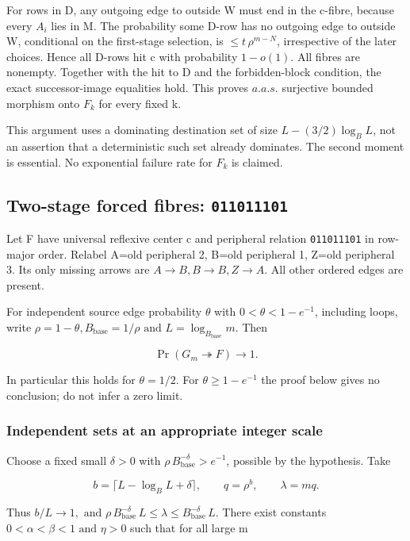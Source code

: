 \documentclass[11pt]{article}
\begin{document}
For rows in D, any outgoing edge to outside W must end in the c-fibre, because every $A_{i}$ lies in M. The probability some D-row has no outgoing edge to outside W, conditional on the first-stage selection, is $\leq t\,\rho ^{m-N}$, irrespective of the later choices. Hence all D-rows hit c with probability $1-o(1)$. All fibres are nonempty. Together with the hit to D and the forbidden-block condition, the exact successor-image equalities hold. This proves $a.a.s$. surjective bounded morphism onto $F_{k}$ for every fixed k.

This argument uses a dominating destination set of size $L-(3/2)\log _{B} L$, not an assertion that a deterministic such set already dominates. The second moment is essential. No exponential failure rate for $F_{k}$ is claimed.

\subsection{Two-stage forced fibres: \texttt{011011101}}

Let F have universal reflexive center c and peripheral relation \texttt{011011101} in row-major order. Relabel A=old peripheral 2, B=old peripheral 1, Z=old peripheral 3. Its only missing arrows are $A\to B, B\to B, Z\to A$. All other ordered edges are present.

For independent source edge probability $\theta $ with $0<\theta <1-e^{-1}$, including loops, write $\rho =1-\theta , B_{\mathrm{base}}=1/\rho  \text{ and } L=\log _{B_{\mathrm{base}}} m$. Then

\[
\Pr(G_m\twoheadrightarrow F)\longrightarrow1.
\]

In particular this holds for $\theta =1/2$. For $\theta \geq 1-e^{-1}$ the proof below gives no conclusion; do not infer a zero limit.

\subsubsection{Independent sets at an appropriate integer scale}

Choose a fixed small $\delta >0$ with $\rho \,B_{\mathrm{base}}^{-\delta }>e^{-1}$, possible by the hypothesis. Take

\[
b=\lceil L-\log_B L+\delta\rceil,\qquad q=\rho^b,\qquad \lambda=mq.
\]

Thus $b/L\to 1, \text{ and } \rho \,B_{\mathrm{base}}^{-\delta }\,L \leq \lambda \leq B_{\mathrm{base}}^{-\delta }\,L$. There exist constants $0<\alpha <\beta <1 \text{ and } \eta >0$ such that for all large m
\end{document}
